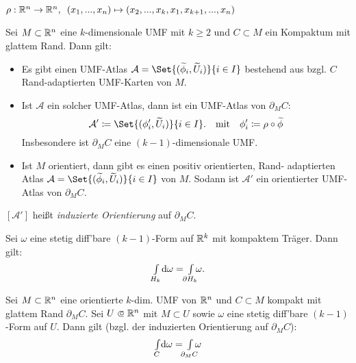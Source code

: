 \documentclass{cheat-sheet}
\newcommand{\Atlas}{\mathcal{A}} %
\theoremstyle{definition}
\newcommand{\Intdf}[2]{{\textstyle \int\limits_{#1}} #2} %
\begin{document}
\begin{nota}
  $\rho : \mathbb{R}^n \to \mathbb{R}^n, \enspace (x_1, ..., x_n) \mapsto (x_2, ..., x_k, x_1, x_{k+1}, ..., x_n)$
\end{nota}

\begin{lem}
  Sei $M \subset \mathbb{R}^n$ eine $k$-dimensionale UMF mit $k \geq 2$ und $C \subset M$ ein Kompaktum mit glattem Rand. Dann gilt:
  \begin{itemize}
    \item Es gibt einen UMF-Atlas $\Atlas = \Set{ (\widetilde{\phi}_i, \widetilde{U}_i) }{ i \in I }$ bestehend aus bzgl. $C$ Rand-adaptierten UMF-Karten von $M$.
    \item  Ist $\Atlas$ ein solcher UMF-Atlas, dann ist ein UMF-Atlas von $\partial_M C$:
    \[
      \Atlas' \coloneqq \Set{ (\phi_i', \widetilde{U}_i) }{ i \in I }.
      \quad \text{mit} \quad
      \phi_i' \coloneqq \rho \circ \widetilde{\phi}
    \]
    Insbesondere ist $\partial_M C$ eine $(k{-}1)$-dimensionale UMF.
    \item Ist $M$ orientiert, dann gibt es einen positiv orientierten, Rand- adaptierten Atlas $\Atlas = \Set{ (\widetilde{\phi}_i, \widetilde{U}_i) }{ i \in I }$ von $M$. Sodann ist $\Atlas'$ ein orientierter UMF-Atlas von $\partial_M C$.
  \end{itemize}
\end{lem}

\begin{defn}
   $[\Atlas']$ heißt \emph{induzierte Orientierung} auf $\partial_M C$.
\end{defn}


\begin{lem}
  Sei $\omega$ eine stetig diff'bare $(k{-}1)$-Form auf $\mathbb{R}^k$ mit kompaktem Träger. Dann gilt:
  \[ \Intdf{H_k}{\d \omega} = \, \Intdf{\mathclap{\partial H_k}}{\, \omega}. \]
\end{lem}

\begin{satz}[Stokes]
  Sei $M \subset \mathbb{R}^n$ eine orientierte $k$-dim. UMF von $\mathbb{R}^n$ und $C \subset M$ kompakt mit glattem Rand $\partial_M C$. Sei $U \opn \R^n$ mit $M \subset U$ sowie $\omega$ eine stetig diff'bare $(k{-}1)$-Form auf $U$. Dann gilt (bzgl. der induzierten Orientierung auf $\partial_M C$):
  \[ \Intdf{C}{\d \omega} = \, \Intdf{\mathclap{\partial_M C}}{\,\omega} \]
\end{satz}
\end{document}

